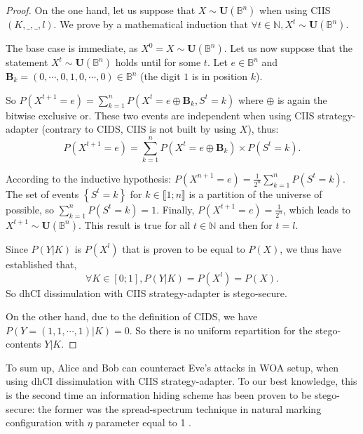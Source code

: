 \documentclass{comjnl}
\begin{document}
\begin{proof}   On   the    one   hand,   let   us   suppose    that   $X   \sim
\mathbf{U}\left(\mathbb{B}^n\right)$  when  using  \linebreak CIIS$(K,\_,\_,l)$.
We  prove  by  a
mathematical   induction   that   $\forall    t   \in   \mathds{N},   X^t   \sim
\mathbf{U}\left(\mathbb{B}^n\right)$.

The     base     case     is     immediate,     as     $X^0     =     X     \sim
\mathbf{U}\left(\mathbb{B}^n\right)$. Let us now suppose that the statement $X^t
\sim  \mathbf{U}\left(\mathbb{B}^n\right)$  holds  until for  some $t$. 
Let  $e  \in
\mathbb{B}^n$   and   \linebreak   $\mathbf{B}_k=(0,\cdots,0,1,0,\cdots,0)   \in
\mathbb{B}^n$ (the digit $1$ is in position $k$).

So    
$P\left(X^{t+1}=e\right)=\sum_{k=1}^n
P\left(X^t=e\oplus\mathbf{B}_k,S^t=k\right)$ where  
$\oplus$ is again the bitwise exclusive or. 
These  two events are  independent when
using CIIS strategy-adapter 
(contrary to CIDS, CIIS is not built by using $X$),
 thus:
$$P\left(X^{t+1}=e\right)=\sum_{k=1}^n
P\left(X^t=e\oplus\mathbf{B}_k\right) \times  P\left(S^t=k\right).$$ 

According to the
inductive    hypothesis:   $P\left(X^{n+1}=e\right)=\frac{1}{2^n}   \sum_{k=1}^n
P\left(S^t=k\right)$.  The set  of events $\left \{ S^t=k \right  \}$ for $k \in
\llbracket  1;n \rrbracket$  is  a partition  of  the universe  of possible,  so
$\sum_{k=1}^n                  P\left(S^t=k\right)=1$.                  Finally,
$P\left(X^{t+1}=e\right)=\frac{1}{2^n}$,   which    leads   to   $X^{t+1}   \sim
\mathbf{U}\left(\mathbb{B}^n\right)$.   This  result  is  true  for all  $t  \in
\mathds{N}$ and then for $t=l$.

Since $P(Y|K)$ is $P(X^l)$ that is proven to be equal to $P(X)$,
we thus  have established that, 
$$\forall K  \in [0;1], P(Y|K)=P(X^{l})=P(X).$$ 
So   dhCI   dissimulation   with   CIIS
strategy-adapter is stego-secure.

On  the  other  hand,  due  to  the  definition  of  CIDS,  we  have  \linebreak
$P(Y=(1,1,\cdots,1)|K)=0$. 
So   there  is   no  uniform  repartition   for  the stego-contents $Y|K$.
\end{proof}



To sum up, Alice  and Bob can counteract Eve's attacks in  WOA setup, when using
dhCI dissimulation with  CIIS strategy-adapter.  To our best  knowledge, this is
the second time an information hiding scheme has been proven to be stego-secure:
the   former  was   the  spread-spectrum   technique  in   natural  marking
configuration with $\eta$ parameter equal to 1 \cite{Cayre2008}.
\end{document}
